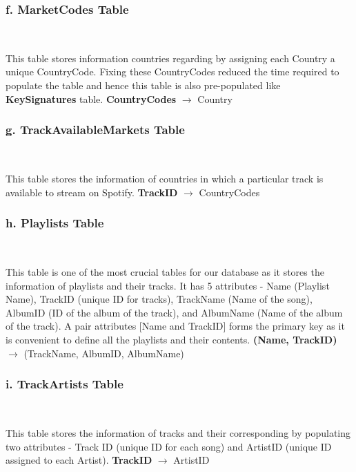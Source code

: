 \documentclass[conference]{IEEEtran}
\begin{document}
\subsubsection*{f. \textbf{MarketCodes} Table} \

This table stores information countries regarding by assigning each Country a unique CountryCode. Fixing these CountryCodes reduced the time required to populate the table and hence this table is also pre-populated like \textbf{KeySignatures} table. \linebreak \linebreak  
\textbf{CountryCodes} $\to$ Country \linebreak


\subsubsection*{g. \textbf{TrackAvailableMarkets} Table} \

This table stores the information of countries in which a particular track is available to stream on Spotify. \linebreak \linebreak
\textbf{TrackID} $\to$ CountryCodes \linebreak


\subsubsection*{h. \textbf{Playlists} Table} \

This table is one of the most crucial tables for our database as it stores the information of playlists and their tracks. It has 5 attributes - Name (Playlist Name), TrackID (unique ID for tracks), TrackName (Name of the song), AlbumID (ID of the album of the track), and AlbumName (Name of the album of the track). A pair attributes [Name and TrackID] forms the primary key as it is convenient to define all the playlists and their contents. \linebreak \linebreak
\textbf{(Name, TrackID)} $\to$ (TrackName, AlbumID, AlbumName) \linebreak

\subsubsection*{i. \textbf{TrackArtists} Table} \

This table stores the information of tracks and their corresponding by populating two attributes - Track ID (unique ID for each song) and ArtistID (unique ID assigned to each Artist). \linebreak \linebreak
\textbf{TrackID} $\to$ ArtistID \linebreak
\end{document}
